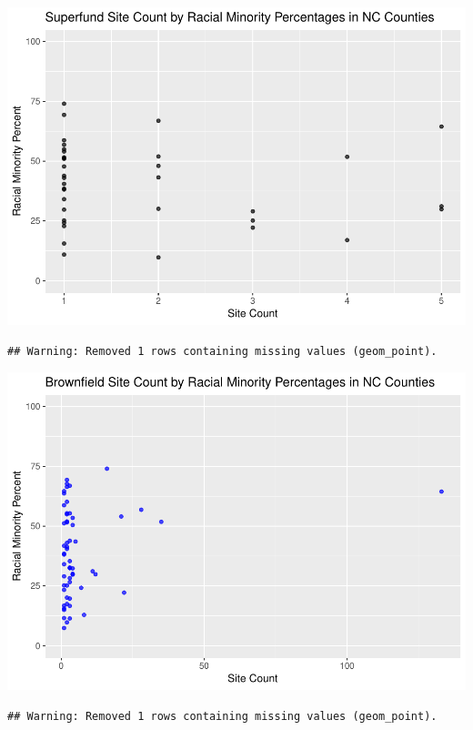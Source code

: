 \documentclass[12pt,]{article}
\begin{document}
\includegraphics{Townsend_Project_Template_files/figure-latex/final visualizations-3.pdf}

\begin{verbatim}
## Warning: Removed 1 rows containing missing values (geom_point).
\end{verbatim}

\includegraphics{Townsend_Project_Template_files/figure-latex/final visualizations-4.pdf}

\begin{verbatim}
## Warning: Removed 1 rows containing missing values (geom_point).
\end{verbatim}
\end{document}
